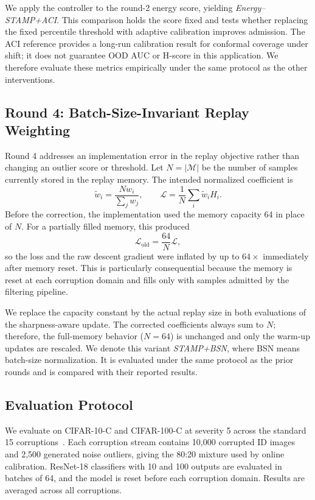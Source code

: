 We apply the controller to the round-2 energy score, yielding
\emph{Energy--STAMP+ACI}. This comparison holds the score fixed and tests
whether replacing the fixed percentile threshold with adaptive calibration
improves admission. The ACI reference provides a long-run calibration result
for conformal coverage under shift; it does not guarantee OOD AUC or H-score in
this application. We therefore evaluate these metrics empirically under the
same protocol as the other interventions.

\subsection{Round 4: Batch-Size-Invariant Replay Weighting}
Round 4 addresses an implementation error in the replay objective rather than
changing an outlier score or threshold. Let $N=|\mathcal{M}|$ be the number of
samples currently stored in the replay memory. The intended normalized
coefficient is
\begin{equation}
    \widetilde{w}_i=\frac{Nw_i}{\sum_j w_j},
    \qquad
    \mathcal{L}=\frac{1}{N}\sum_i\widetilde{w}_iH_i.
    \label{eq:batch-normalized-loss}
\end{equation}
Before the correction, the implementation used the memory capacity 64 in place
of $N$. For a partially filled memory, this produced
\begin{equation}
    \mathcal{L}_{\mathrm{old}}=\frac{64}{N}\mathcal{L},
    \label{eq:loss-scale-error}
\end{equation}
so the loss and the raw descent gradient were inflated by up to $64\times$
immediately after memory reset. This is particularly consequential because the
memory is reset at each corruption domain and fills only with samples admitted
by the filtering pipeline.

We replace the capacity constant by the actual replay size in both evaluations
of the sharpness-aware update. The corrected coefficients always sum to $N$;
therefore, the full-memory behavior ($N=64$) is unchanged and only the warm-up
updates are rescaled. We denote this variant \emph{STAMP+BSN}, where BSN means
batch-size normalization. It is evaluated under the same protocol as the prior
rounds and is compared with their reported results.

\subsection{Evaluation Protocol}
We evaluate on CIFAR-10-C and CIFAR-100-C at severity 5 across the standard 15
corruptions~\cite{hendrycks2019benchmark}. Each corruption stream contains
10,000 corrupted ID images and 2,500 generated noise outliers, giving the 80:20
mixture used by online calibration. ResNet-18 classifiers with 10 and 100
outputs are evaluated in batches of 64, and the model is reset before each
corruption domain. Results are averaged across all corruptions.

